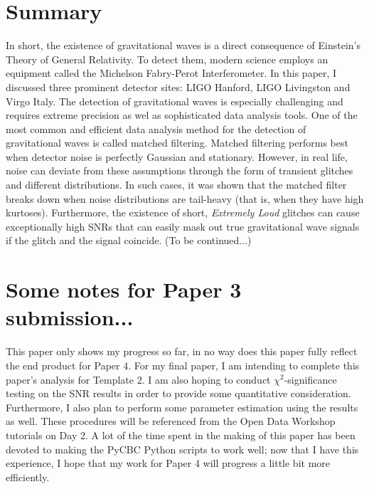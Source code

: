 \documentclass[reprint,
letterpaper,
 amsmath,amssymb,
 aps,
]{revtex4-2}
\begin{document}
\section{Summary}
In short, the existence of gravitational waves is a direct consequence of Einstein’s Theory of General Relativity. To detect them, modern science employs an equipment called the Michelson Fabry-Perot Interferometer. In this paper, I discussed three prominent detector sites: LIGO Hanford, LIGO Livingston and Virgo Italy. The detection of gravitational waves is especially challenging and requires extreme precision as wel as sophisticated data analysis tools. One of the most common and efficient data analysis method for the detection of gravitational waves is called matched filtering. Matched filtering performs best when detector noise is perfectly Gaussian and stationary. However, in real life, noise can deviate from these assumptions through the form of transient glitches and different distributions. In such cases, it was shown that the matched filter breaks down when noise distributions are tail-heavy (that is, when they have high kurtoses). Furthermore, the existence of short, \textit{Extremely Loud} glitches can cause exceptionally high SNRs that can easily mask out true gravitational wave signals if the glitch and the signal coincide. (To be continued...)

\section{Some notes for Paper 3 submission...}
This paper only shows my progress so far, in no way does this paper fully reflect the end product for Paper 4. For my final paper, I am intending to complete this paper's analysis for Template 2. I am also hoping to conduct $\chi^2$-significance testing on the SNR results in order to provide some quantitative consideration. Furthermore, I also plan to perform some parameter estimation using the results as well. These procedures will be referenced from the Open Data Workshop tutorials on Day 2. A lot of the time spent in the making of this paper has been devoted to making the PyCBC Python scripts to work well; now that I have this experience, I hope that my work for Paper 4 will progress a little bit more efficiently.
\end{document}
